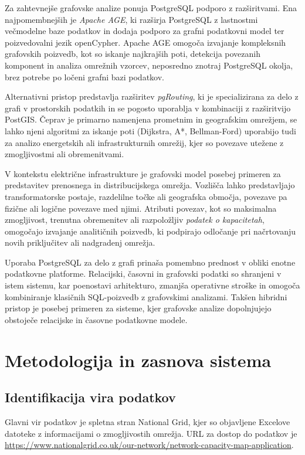 \documentclass[a4paper,12pt,openright]{book}
\begin{document}
Za zahtevnejše grafovske analize ponuja PostgreSQL podporo z razširitvami. Ena najpomembnejših je \textit{Apache AGE}, ki razširja PostgreSQL z lastnostmi večmodelne baze podatkov in dodaja podporo za grafni podatkovni model ter poizvedovalni jezik openCypher. Apache AGE omogoča izvajanje kompleksnih grafovskih poizvedb, kot so iskanje najkrajših poti, detekcija povezanih komponent in analiza omrežnih vzorcev, neposredno znotraj PostgreSQL okolja, brez potrebe po ločeni grafni bazi podatkov.

Alternativni pristop predstavlja razširitev \textit{pgRouting}, ki je specializirana za delo z grafi v prostorskih podatkih in se pogosto uporablja v kombinaciji z razširitvijo PostGIS. Čeprav je primarno namenjena prometnim in geografskim omrežjem, se lahko njeni algoritmi za iskanje poti (Dijkstra, A*, Bellman-Ford) uporabijo tudi za analizo energetskih ali infrastrukturnih omrežij, kjer so povezave utežene z zmogljivostmi ali obremenitvami.

V kontekstu električne infrastrukture je grafovski model posebej primeren za predstavitev prenosnega in distribucijskega omrežja. Vozlišča lahko predstavljajo transformatorske postaje, razdelilne točke ali geografska območja, povezave pa fizične ali logične povezave med njimi. Atributi povezav, kot so maksimalna zmogljivost, trenutna obremenitev ali razpoložljiv \textit{podatek o kapacitetah}, omogočajo izvajanje analitičnih poizvedb, ki podpirajo odločanje pri načrtovanju novih priključitev ali nadgradenj omrežja.

Uporaba PostgreSQL za delo z grafi prinaša pomembno prednost v obliki enotne podatkovne platforme. Relacijski, časovni in grafovski podatki so shranjeni v istem sistemu, kar poenostavi arhitekturo, zmanjša operativne stroške in omogoča kombiniranje klasičnih SQL-poizvedb z grafovskimi analizami. Takšen hibridni pristop je posebej primeren za sisteme, kjer grafovske analize dopolnjujejo obstoječe relacijske in časovne podatkovne modele.


\chapter{Metodologija in zasnova sistema}
\label{ch:metodologija}

\section{Identifikacija vira podatkov}

Glavni vir podatkov je spletna stran National Grid, kjer so objavljene Excelove datoteke z informacijami o zmogljivostih omrežja. URL za dostop do podatkov je \url{https://www.nationalgrid.co.uk/our-network/network-capacity-map-application}. 
\end{document}
